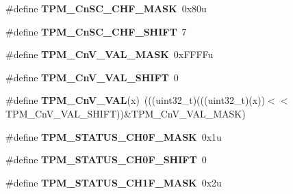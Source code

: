 \begin{DoxyCompactItemize}
\item 
\mbox{\label{group___t_p_m___register___masks_gac8ec8543edea61f3ebe7c98f09addd6c}} 
\#define {\bfseries T\+P\+M\+\_\+\+Cn\+S\+C\+\_\+\+C\+H\+F\+\_\+\+M\+A\+SK}~0x80u
\item 
\mbox{\label{group___t_p_m___register___masks_ga070c2d7e35f829f8f2025682c04193d8}} 
\#define {\bfseries T\+P\+M\+\_\+\+Cn\+S\+C\+\_\+\+C\+H\+F\+\_\+\+S\+H\+I\+FT}~7
\item 
\mbox{\label{group___t_p_m___register___masks_gab65cebe025551107c0b6dd05e5795ae5}} 
\#define {\bfseries T\+P\+M\+\_\+\+Cn\+V\+\_\+\+V\+A\+L\+\_\+\+M\+A\+SK}~0x\+F\+F\+F\+Fu
\item 
\mbox{\label{group___t_p_m___register___masks_ga89562c16ce3c849bd51b1ba1e124b307}} 
\#define {\bfseries T\+P\+M\+\_\+\+Cn\+V\+\_\+\+V\+A\+L\+\_\+\+S\+H\+I\+FT}~0
\item 
\mbox{\label{group___t_p_m___register___masks_ga28132959dec9653625c8f6d16c47d635}} 
\#define {\bfseries T\+P\+M\+\_\+\+Cn\+V\+\_\+\+V\+AL}(x)~(((uint32\+\_\+t)(((uint32\+\_\+t)(x))$<$$<$T\+P\+M\+\_\+\+Cn\+V\+\_\+\+V\+A\+L\+\_\+\+S\+H\+I\+FT))\&T\+P\+M\+\_\+\+Cn\+V\+\_\+\+V\+A\+L\+\_\+\+M\+A\+SK)
\item 
\mbox{\label{group___t_p_m___register___masks_ga2441823dbe4ebc3b7f88773a95eff6d6}} 
\#define {\bfseries T\+P\+M\+\_\+\+S\+T\+A\+T\+U\+S\+\_\+\+C\+H0\+F\+\_\+\+M\+A\+SK}~0x1u
\item 
\mbox{\label{group___t_p_m___register___masks_gab7b122b8ff741ae1bacff6a0929d7adc}} 
\#define {\bfseries T\+P\+M\+\_\+\+S\+T\+A\+T\+U\+S\+\_\+\+C\+H0\+F\+\_\+\+S\+H\+I\+FT}~0
\item 
\mbox{\label{group___t_p_m___register___masks_gaed654f625ebff2d9f8a2cc89ef410330}} 
\#define {\bfseries T\+P\+M\+\_\+\+S\+T\+A\+T\+U\+S\+\_\+\+C\+H1\+F\+\_\+\+M\+A\+SK}~0x2u
\item 
\mbox{\label{group___t_p_m___register___masks_ga531fc0daa18458bc1d781df31cffbfe9}} 
$$
\end{DoxyCompactItemize}
